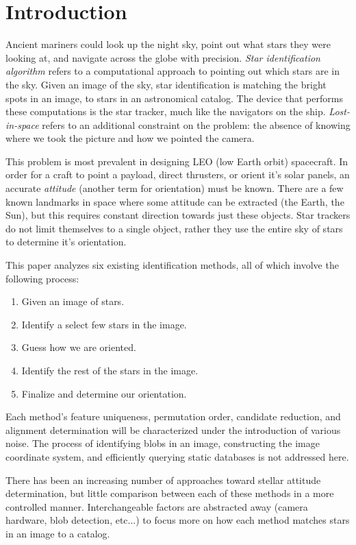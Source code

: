\section{Introduction}
Ancient mariners could look up the night sky, point out what stars they were looking at, and navigate across the globe with precision. \textit{Star identification algorithm} refers to a computational approach to pointing out which stars are in the sky. Given an image of the sky, star identification is matching the bright spots in an image, to stars in an astronomical catalog. The device that performs these computations is the star tracker, much like the navigators on the ship. \textit{Lost-in-space} refers to an additional constraint on the problem: the absence of knowing where we took the picture and how we pointed the camera.

This problem is most prevalent in designing LEO (low Earth orbit) spacecraft. In order for a craft to point a payload, direct thrusters, or orient it's solar panels, an accurate \textit{attitude} (another term for orientation) must be known. There are a few known landmarks in space where some attitude can be extracted (the Earth, the Sun), but this requires constant direction towards just these objects. Star trackers do not limit themselves to a single object, rather they use the entire sky of stars to determine it's orientation.

This paper analyzes six existing identification methods, all of which involve the following process:
\begin{enumerate}
\item Given an image of stars.
\item Identify a select few stars in the image.
\item Guess how we are oriented.
\item Identify the rest of the stars in the image.
\item Finalize and determine our orientation.
\end{enumerate}

Each method's feature uniqueness, permutation order, candidate reduction, and alignment determination will be characterized under the introduction of various noise. The process of identifying blobs in an image, constructing the image coordinate system, and efficiently querying static databases is not addressed here. 

There has been an increasing number of approaches toward stellar attitude determination, but little comparison between each of these methods in a more controlled manner. Interchangeable factors are abstracted away (camera hardware, blob detection, etc...) to focus more on how each method matches stars in an image to a catalog. 

